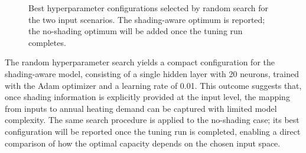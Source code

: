 \documentclass{article}
\begin{document}
\begin{figure}[H]
\centering

\noindent
\begin{minipage}[t]{0.48\columnwidth}
\centering
{}
\end{minipage}
\hfill
\begin{minipage}[t]{0.48\columnwidth}
\centering
{}
\end{minipage}

\caption{Best hyperparameter configurations selected by random search for the two
input scenarios. The shading-aware optimum is reported; the no-shading optimum
will be added once the tuning run completes.}
\label{fig:hp_cards}
\end{figure}


The random hyperparameter search yields a compact configuration for the shading-aware
model, consisting of a single hidden layer with 20 neurons, trained with the Adam
optimizer and a learning rate of 0.01. This outcome suggests that, once shading
information is explicitly provided at the input level, the mapping from inputs to
annual heating demand can be captured with limited model complexity. The same search
procedure is applied to the no-shading case; its best configuration will be reported
once the tuning run is completed, enabling a direct comparison of how the optimal
capacity depends on the chosen input space.
\end{document}

